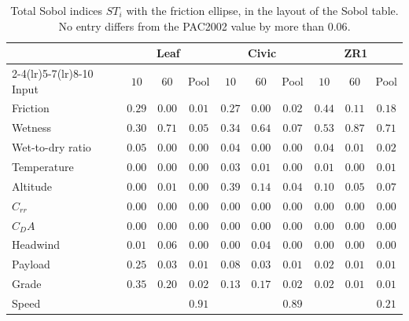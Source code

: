 \begin{table}[htbp]
\centering\small
\setlength{\tabcolsep}{4.2pt}
\caption{Total Sobol indices $ST_i$ with the friction ellipse, in the layout of the Sobol table. No entry differs from the PAC2002 value by more than $0.06$.}\label{tab:app-sobol-ellipse}
\begin{tabular}{lccccccccc}
\toprule
& \multicolumn{3}{c}{Leaf} & \multicolumn{3}{c}{Civic} & \multicolumn{3}{c}{ZR1}\\
\cmidrule(lr){2-4}\cmidrule(lr){5-7}\cmidrule(lr){8-10}
Input & $10$ & $60$ & Pool & $10$ & $60$ & Pool & $10$ & $60$ & Pool\\
\midrule
Friction & $0.29$ & $0.00$ & $0.01$ & $0.27$ & $0.00$ & $0.02$ & $0.44$ & $0.11$ & $0.18$\\
Wetness & $0.30$ & $0.71$ & $0.05$ & $0.34$ & $0.64$ & $0.07$ & $0.53$ & $0.87$ & $0.71$\\
Wet-to-dry ratio & $0.05$ & $0.00$ & $0.00$ & $0.04$ & $0.00$ & $0.00$ & $0.04$ & $0.01$ & $0.02$\\
Temperature & $0.00$ & $0.00$ & $0.00$ & $0.03$ & $0.01$ & $0.00$ & $0.01$ & $0.00$ & $0.01$\\
Altitude & $0.00$ & $0.01$ & $0.00$ & $0.39$ & $0.14$ & $0.04$ & $0.10$ & $0.05$ & $0.07$\\
$C_{rr}$ & $0.00$ & $0.00$ & $0.00$ & $0.00$ & $0.00$ & $0.00$ & $0.00$ & $0.00$ & $0.00$\\
$C_DA$ & $0.00$ & $0.00$ & $0.00$ & $0.00$ & $0.00$ & $0.00$ & $0.00$ & $0.00$ & $0.00$\\
Headwind & $0.01$ & $0.06$ & $0.00$ & $0.00$ & $0.04$ & $0.00$ & $0.00$ & $0.00$ & $0.00$\\
Payload & $0.25$ & $0.03$ & $0.01$ & $0.08$ & $0.03$ & $0.01$ & $0.02$ & $0.01$ & $0.01$\\
Grade & $0.35$ & $0.20$ & $0.02$ & $0.13$ & $0.17$ & $0.02$ & $0.02$ & $0.01$ & $0.01$\\
\midrule
Speed &  &  & $0.91$ &  &  & $0.89$ &  &  & $0.21$\\
\bottomrule
\end{tabular}
\end{table}

